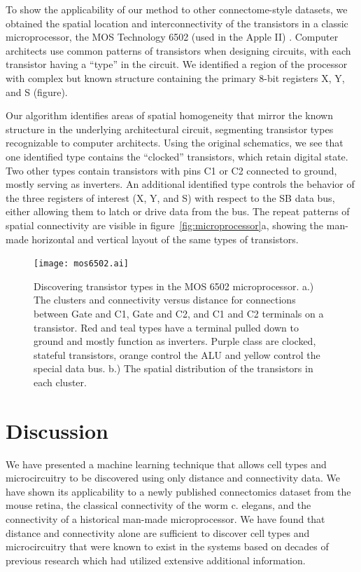 \documentclass{article}
\begin{document}
To show the applicability of our method to other connectome-style
datasets, we obtained the spatial location and interconnectivity of
the transistors in a classic microprocessor, the MOS Technology 6502
(used in the Apple II) \autocite{James2010}. Computer architects use
common patterns of transistors when designing circuits, with each
transistor having a ``type'' in the circuit. We identified a region of
the processor with complex but known structure containing the primary
8-bit registers X, Y, and S (figure).

Our algorithm identifies areas of spatial homogeneity that mirror the
known structure in the underlying architectural circuit, segmenting
transistor types recognizable to computer architects. Using the
original schematics, we see that one identified type contains the
``clocked'' transistors, which retain digital state. Two other types
contain transistors with pins C1 or C2 connected to ground, mostly
serving as inverters.  An additional identified type controls the
behavior of the three registers of interest (X, Y, and S) with respect
to the SB data bus, either allowing them to latch or drive data from
the bus. The repeat patterns of spatial connectivity are visible in
figure~\ref{fig:microprocessor}a, showing the man-made horizontal and
vertical layout of the same types of transistors.



\begin{figure}
  \centering 
  \centerline{\texttt{[image: mos6502.ai]}}
  \caption{Discovering transistor types in the MOS 6502
    microprocessor. a.) The clusters and connectivity versus distance
    for connections between Gate and C1, Gate and C2, and C1 and C2
    terminals on a transistor. Red and teal types have a terminal
    pulled down to ground and mostly function as inverters. Purple
    class are clocked, stateful transistors, orange control the ALU
    and yellow control the special data bus. b.) The spatial
    distribution of the transistors in each cluster. }
\label{fig:mos6502}
\end{figure}


\section{Discussion}
We have presented a machine learning technique that allows cell types
and microcircuitry to be discovered using only distance and
connectivity data. We have shown its applicability to a newly
published connectomics dataset from the mouse retina, the classical
connectivity of the worm c. elegans, and the connectivity of a
historical man-made microprocessor. We have found that distance and
connectivity alone are sufficient to discover cell types and
microcircuitry that were known to exist in the systems based on decades
of previous research which had utilized extensive additional
information.
\end{document}
